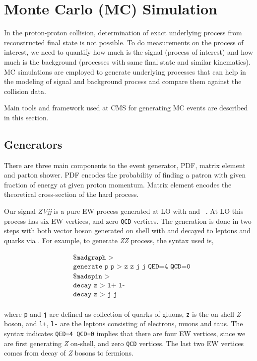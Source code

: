 \section{
  Monte Carlo (MC) Simulation
 }

In the proton-proton collision, determination of
exact underlying process from reconstructed final state is not possible.
To do measurements on the process of interest,
we need to quantify how much is the signal (process of interest)
and how much is the background (processes with same final state and
similar kinematics). \gls{MC} simulations are employed
to generate underlying processes that can help in the
modeling of signal and background process and compare them against the collision
data.

Main tools and framework
used at \gls{CMS} for generating \gls{MC} events
are described in this section.

\subsection{
  Generators
}

There are three main components to the event generator,
\gls{PDF}, matrix element and parton shower.
\gls{PDF} encodes the probability of finding a patron
with given fraction of energy at given proton momentum.
Matrix element encodes
the theoretical cross-section of the hard process.

Our signal \textit{ZVjj} is a pure \gls{EW} process generated
at \gls{LO} with \MGvATNLO{} and \MADSPIN{}~\cite{madgraph,madspin}.
At \gls{LO} this process has six \gls{EW} vertices, and
zero \texttt{QCD} vertices. The generation is done
in two steps with both vector boson generated on shell
with \MADGRAPH{} and decayed to leptons and quarks via \MADSPIN{}.
For example, to generate \textit{ZZ} process, the syntax used is,

\begin{align*}
   & \texttt{\$ madgraph >}                      \\
   & \texttt{generate p p > z z j j QED=4 QCD=0} \\
   & \texttt{\$ madspin >}                       \\
   & \texttt{decay z > l+ l-}                    \\
   & \texttt{decay z > j j}                      \\
\end{align*}

where \texttt{p} and \texttt{j} are defined as collection of quarks of gluons,
\texttt{z} is the on-shell \textit{Z} boson, and \texttt{l+}, \texttt{l-}
are the leptons consisting of electrons, muons and taus. The syntax
indicates \texttt{QED=4 QCD=0} implies that there are four \gls{EW}
vertices, since we are first generating \textit{Z} on-shell, and zero
\texttt{QCD} vertices. The last two \gls{EW} vertices comes from
decay of \textit{Z} bosons to fermions.

